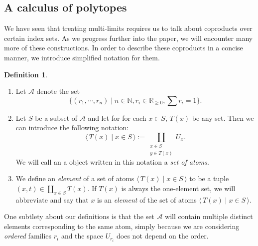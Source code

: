 \documentclass[a4paper]{amsproc}
\theoremstyle{plain}
\theoremstyle{definition}
\newtheorem{definition}[theorem]{Definition}
\theoremstyle{remark}
\numberwithin{equation}{section}
\newcommand{\Prob}{\mathfrak{Prob}}
\newcommand{\la}{\langle\,}
\newcommand{\ra}{\,\rangle}
\begin{document}
\subsection{A calculus of polytopes}

We have seen that treating multi-limits requires us to talk about coproducts over certain index sets. As we progress further into the paper, we will encounter many more of these constructions. In order to describe these coproducts in a concise manner, we introduce simplified notation for them.


\begin{definition}
    \begin{enumerate}

        \item Let $\mathcal{A}$ denote the set
        \[
            \{(r_1,\cdots, r_n) \mid n \in \mathbb{N}, r_i \in \mathbb{R}_{\geq 0}, \sum r_i = 1\}.
        \]
        \item Let $S$ be a subset of $\mathcal{A}$ and let for for each $x \in S$, $T(x)$ be any set. Then we can introduce the following notation:
        \[
            \la T(x) \mid x \in S \ra := \coprod_{\substack{x \in S \\ y \in T(x)}} U_x .
        \]
        We will call an a object written in this notation a \emph{set of atoms}.
        \item We define an \emph{element} of a set of atoms $\la T(x) \mid x \in S \ra$ to be a tuple $(x,t) \in \coprod_{x \in S} T(x)$. If $T(x)$ is always the one-element set, we will abbreviate and say that $x$ is an \emph{element} of the set of atoms $\la T(x) \mid x \in S \ra$.
    \end{enumerate}
\end{definition}

One subtlety about our definitions is that the set $\mathcal{A}$ will contain multiple distinct elements corresponding to the same atom, simply because we are considering \emph{ordered} families $r_i$ and the space $U_{r_i}$ does not depend on the order.
\end{document}
